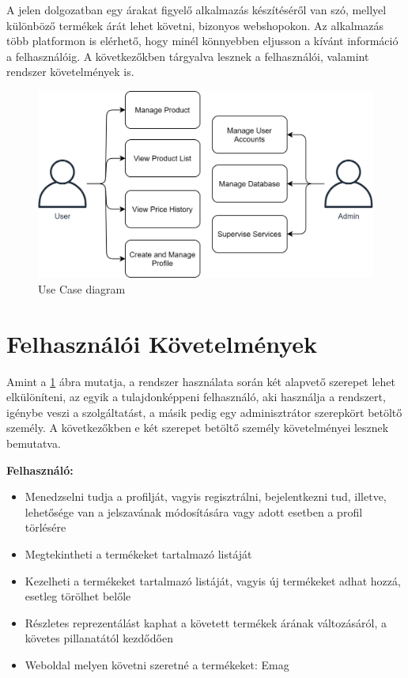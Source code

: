 A jelen dolgozatban egy árakat figyelő alkalmazás készítéséről van szó, mellyel különböző termékek árát lehet követni, bizonyos webshopokon. Az alkalmazás több platformon is elérhető, hogy minél könnyebben eljusson a kívánt információ a felhasználóig. A következőkben tárgyalva lesznek a felhasználói, valamint rendszer követelmények is.

\begin{figure}[H]
    \centering
    \includegraphics[scale=1.2]{figures/images/general_use_case.png}
    \caption{Use Case diagram}
    \label{fig:general_use_case}
\end{figure}
\section{Felhasználói Követelmények}

Amint a \ref{fig:general_use_case} ábra mutatja, a rendszer használata során két alapvető szerepet lehet elkülöníteni, az egyik a tulajdonképpeni felhasználó, aki használja a rendszert, igénybe veszi a szolgáltatást, a másik pedig egy adminisztrátor szerepkört betöltő személy. A következőkben e két szerepet betöltő személy követelményei lesznek bemutatva.


\textbf{Felhasználó:}
\begin{itemize}
    \item Menedzselni tudja a profilját, vagyis regisztrálni, bejelentkezni tud, illetve, lehetősége van a jelszavának módosítására vagy adott esetben a profil törlésére
    \item Megtekintheti a termékeket tartalmazó listáját
    \item Kezelheti a termékeket tartalmazó listáját, vagyis új termékeket adhat hozzá, esetleg törölhet belőle
    \item Részletes reprezentálást kaphat a követett termékek árának változásáról, a követes pillanatától kezdődően
    \item Weboldal melyen követni szeretné a termékeket: Emag
\end{itemize}

